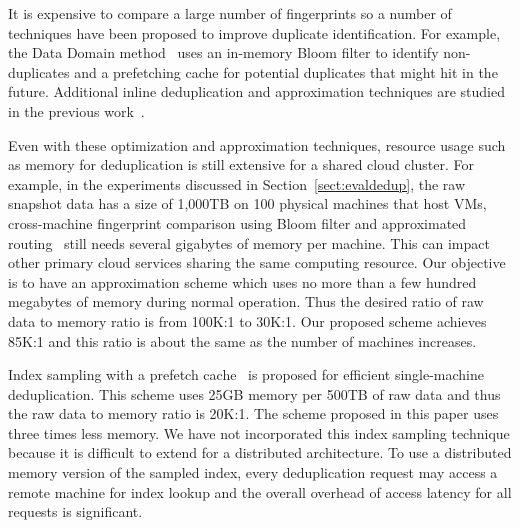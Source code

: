 It is expensive to compare a large number of fingerprints
so a number of techniques have been proposed to improve duplicate identification. 
For example, the Data Domain method~\cite{bottleneck08} 
uses an in-memory Bloom filter to identify non-duplicates and a prefetching cache for potential
duplicates that might hit in the future.
Additional inline deduplication and  approximation techniques
are studied in the previous work~\cite{extreme_binning09,sparseindex09,Srinivasan2012,WeiZhangIEEE}.  

Even with these optimization and approximation techniques, resource usage such as memory  for deduplication
is still extensive for a shared cloud cluster.  
For example, in the experiments discussed in Section~\ref{sect:evaldedup}, 
the raw snapshot data has a size of 1,000TB on 100 physical machines that host VMs,
cross-machine fingerprint comparison using Bloom filter and approximated routing~\cite{bottleneck08,Dong2011} 
still needs several gigabytes of memory per machine. This can impact other primary cloud services sharing the same
computing resource. Our objective is to have an approximation scheme 
which uses no more than a few hundred megabytes of memory during normal operation.
Thus the  desired ratio of raw data to memory ratio is from 100K:1 to 30K:1.
Our proposed scheme achieves 85K:1
and this ratio is about the same as the number of machines increases.

Index sampling with a prefetch cache~\cite{Guo2011} 
is proposed 
for efficient single-machine deduplication. 
This scheme uses 25GB memory per 500TB of raw data
and thus the raw data to memory ratio is 20K:1. The scheme proposed in this paper 
uses three times less memory. We have not incorporated this index 
sampling technique because it is difficult to extend 
for a distributed architecture.  To use a distributed memory version 
of the sampled index, every deduplication
request may access a remote machine for index lookup and the overall overhead 
of access latency for all requests is significant.

